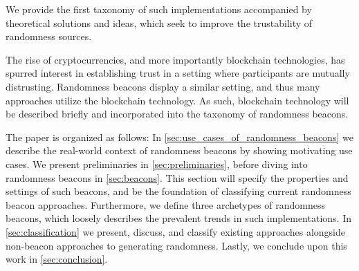 We provide the first taxonomy of such implementations accompanied by theoretical solutions and ideas, which seek to improve the trustability of randomness sources.

The rise of cryptocurrencies, and more importantly blockchain technologies, has spurred interest in establishing trust in a setting where participants are mutually distrusting.
Randomness beacons display a similar setting, and thus many approaches utilize the blockchain technology.
As such, blockchain technology will be described briefly and incorporated into the taxonomy of randomness beacons.

The paper is organized as follows:
In \cref{sec:use_cases_of_randomness_beacons} we describe the real-world context of randomness beacons by showing motivating use cases.
We present preliminaries in \cref{sec:preliminaries}, before diving into randomness beacons in \cref{sec:beacons}.
This section will specify the properties and settings of such beacons, and be the foundation of classifying current randomness beacon approaches.
Furthermore, we define three archetypes of randomness beacons, which loosely describes the prevalent trends in such implementations.
In \cref{sec:classification} we present, discuss, and classify existing approaches alongside non-beacon approaches to generating randomness. 
Lastly, we conclude upon this work in \cref{sec:conclusion}.


